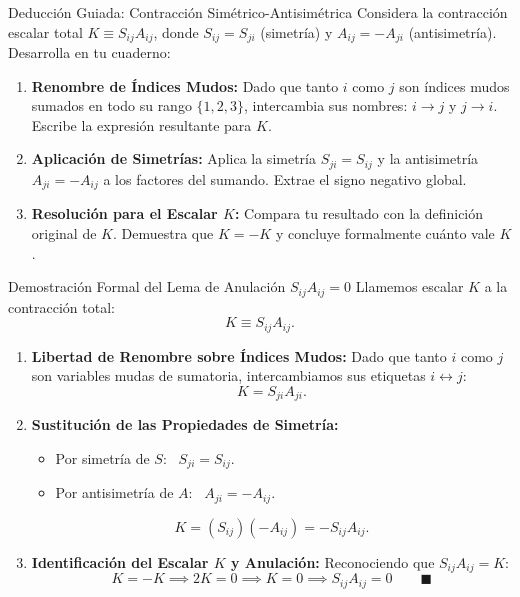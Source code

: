 \documentclass[10pt,aspectratio=169]{beamer}
\begin{document}
\begin{frame}{Deducción Guiada: Contracción Simétrico-Antisimétrica}
  \vspace{0.05cm}
  Considera la contracción escalar total $K \equiv S_{ij}A_{ij}$, donde $S_{ij} = S_{ji}$ (simetría) y $A_{ij} = -A_{ji}$ (antisimetría). Desarrolla en tu cuaderno:
  \vspace{0.22cm}
  \begin{enumerate}\itemsep10pt
    \item[(a)] \textbf{Renombre de Índices Mudos:} Dado que tanto $i$ como $j$ son índices mudos sumados en todo su rango $\{1, 2, 3\}$, intercambia sus nombres: $i \to j$ y $j \to i$. Escribe la expresión resultante para $K$.
    \item[(b)] \textbf{Aplicación de Simetrías:} Aplica la simetría $S_{ji} = S_{ij}$ y la antisimetría $A_{ji} = -A_{ij}$ a los factores del sumando. Extrae el signo negativo global.
    \item[(c)] \textbf{Resolución para el Escalar $K$:} Compara tu resultado con la definición original de $K$. Demuestra que $K = -K$ y concluye formalmente cuánto vale $K$.
  \end{enumerate}
\end{frame}

\begin{frame}{Demostración Formal del Lema de Anulación $S_{ij}A_{ij} = 0$}
  \footnotesize
  Llamemos escalar $K$ a la contracción total:
  \[
  K \equiv S_{ij} A_{ij}.
  \]
  \begin{enumerate}\itemsep4pt
    \item \textbf{Libertad de Renombre sobre Índices Mudos:}
    Dado que tanto $i$ como $j$ son variables mudas de sumatoria, intercambiamos sus etiquetas $i \leftrightarrow j$:
    \[
    K = S_{ji} A_{ji}.
    \]
    \item \textbf{Sustitución de las Propiedades de Simetría:}
    \begin{itemize}\itemsep2pt
      \item Por simetría de $S$: \ $S_{ji} = S_{ij}$.
      \item Por antisimetría de $A$: \ $A_{ji} = -A_{ij}$.
    \end{itemize}
    \[
    K = (S_{ij})(-A_{ij}) = -S_{ij} A_{ij}.
    \]
    \item \textbf{Identificación del Escalar $K$ y Anulación:}
    Reconociendo que $S_{ij}A_{ij} = K$:
    \[
    K = -K \implies 2K = 0 \implies \boxed{K = 0} \implies \boxed{S_{ij} A_{ij} = 0} \qquad \blacksquare
    \]
  \end{enumerate}
\end{frame}
\end{document}

